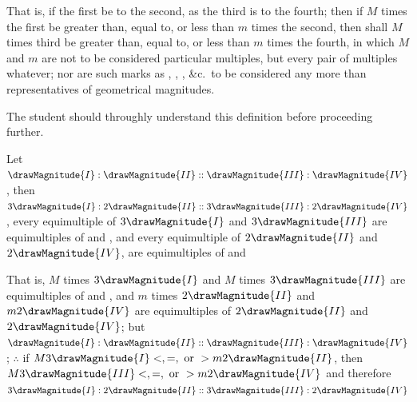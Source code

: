 \documentclass[booklanguage=english]{byrnebook}
\begin{document}
That is, if the first be to the second, as the third is to the fourth; then if $M$ times the first be greater than, equal to, or less than $m$ times the second, then shall $M$ times third be greater than, equal to, or less than $m$ times the fourth, in which $M$ and $m$ are not to be considered particular multiples, but every pair of multiples whatever; nor are such marks as , , , \&c.\ to be considered any more than representatives of geometrical magnitudes.

The student should throughly understand this definition before proceeding further.

\vfill\pagebreak

\label{prop:V.IV}

Let $\drawMagnitude{I} : \drawMagnitude{II} :: \drawMagnitude{III} : \drawMagnitude{IV}$, then $3\drawMagnitude{I} : 2\drawMagnitude{II} :: 3\drawMagnitude{III} : 2\drawMagnitude{IV}$, every equimultiple of $3\drawMagnitude{I}$ and $3\drawMagnitude{III}$ are equimultiples of  and , and every equimultiple of $2\drawMagnitude{II}$ and $2\drawMagnitude{IV}$, are equimultiples of  and  

That is, $M$ times $3\drawMagnitude{I}$ and $M$ times $3\drawMagnitude{III}$ are equimultiples of  and , and $m$ times $2\drawMagnitude{II}$ and $m 2\drawMagnitude{IV}$ are equimultiples of $2\drawMagnitude{II}$ and $2\drawMagnitude{IV}$; but $\drawMagnitude{I} : \drawMagnitude{II} :: \drawMagnitude{III} : \drawMagnitude{IV}$ \byref{\hypref}; $\therefore$ if $M 3\drawMagnitude{I} <, =, \mbox{ or } > m 2 \drawMagnitude{II}$, then $M 3\drawMagnitude{III} <, =, \mbox{ or } > m 2 \drawMagnitude{IV}$  and therefore $3\drawMagnitude{I} : 2\drawMagnitude{II} :: 3\drawMagnitude{III} : 2\drawMagnitude{IV}$ 
\end{document}
